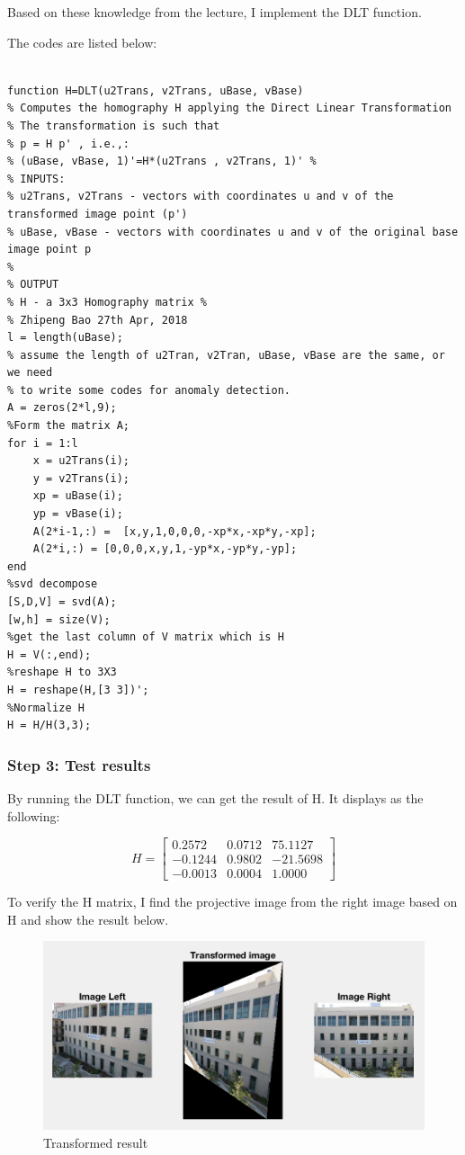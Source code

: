 \documentclass{article}
\begin{document}
Based on these knowledge from the lecture, I implement the DLT function. 

The codes are listed below:

\begin{lstlisting}

function H=DLT(u2Trans, v2Trans, uBase, vBase)
% Computes the homography H applying the Direct Linear Transformation
% The transformation is such that
% p = H p' , i.e.,:
% (uBase, vBase, 1)'=H*(u2Trans , v2Trans, 1)' %
% INPUTS:
% u2Trans, v2Trans - vectors with coordinates u and v of the transformed image point (p')
% uBase, vBase - vectors with coordinates u and v of the original base image point p
%
% OUTPUT
% H - a 3x3 Homography matrix %
% Zhipeng Bao 27th Apr, 2018
l = length(uBase);
% assume the length of u2Tran, v2Tran, uBase, vBase are the same, or we need
% to write some codes for anomaly detection.
A = zeros(2*l,9);
%Form the matrix A;
for i = 1:l
    x = u2Trans(i);
    y = v2Trans(i);
    xp = uBase(i);
    yp = vBase(i);
    A(2*i-1,:) =  [x,y,1,0,0,0,-xp*x,-xp*y,-xp];
    A(2*i,:) = [0,0,0,x,y,1,-yp*x,-yp*y,-yp];
end
%svd decompose
[S,D,V] = svd(A);
[w,h] = size(V);
%get the last column of V matrix which is H
H = V(:,end);
%reshape H to 3X3
H = reshape(H,[3 3])';
%Normalize H
H = H/H(3,3);

\end{lstlisting}

\subsubsection*{Step 3: Test results}

By running the DLT function, we can get the result of H. It displays as the following:

$$H = \begin{bmatrix} 0.2572 & 0.0712 & 75.1127 \\ -0.1244 & 0.9802 & -21.5698 \\ -0.0013 & 0.0004 & 1.0000 \end{bmatrix} $$

To verify the H matrix, I find the projective image from the right image based on H and show the result below.

\begin{figure}[htbp]
    \centering
    \includegraphics[scale = 0.6]{t2_2.png}
    \caption{Transformed result}
    \label{fig28}
\end{figure}
\end{document}
